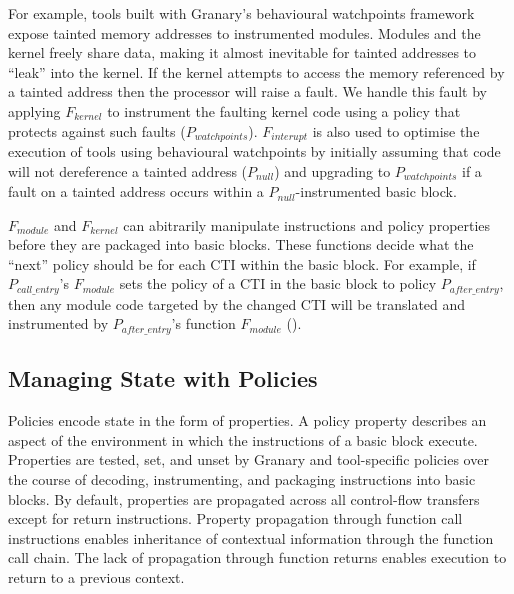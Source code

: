 \documentclass[letterpaper,twocolumn,10pt]{article}
\begin{document}
For example, tools built with Granary's behavioural watchpoints framework expose tainted memory addresses to instrumented modules. Modules and the kernel freely share data, making it almost inevitable for  tainted addresses to ``leak'' into the kernel. If the kernel attempts to access the memory referenced by a tainted address then the processor will raise a fault. We handle this fault by applying $F_{kernel}$ to instrument the faulting kernel code using a policy that protects against such faults ($P_{watchpoints}$). $F_{interupt}$ is also used to optimise the execution of tools using behavioural watchpoints by initially assuming that code will not dereference a tainted address ($P_{null}$) and upgrading to $P_{watchpoints}$ if a fault on a tainted address occurs within a $P_{null}$-instrumented basic block.



$F_{module}$ and $F_{kernel}$ can abitrarily manipulate instructions and policy properties before they are packaged into basic blocks. These functions decide what the ``next'' policy should be for each CTI within the basic block. For example, if $P_{call\_entry}$'s $F_{module}$ sets the policy of a CTI in the basic block to policy $P_{after\_entry}$, then any module code targeted by the changed CTI will be translated and instrumented by $P_{after\_entry}$'s function $F_{module}$ (). 


\subsection{Managing State with Policies}

Policies encode state in the form of properties. A policy property describes an aspect of the environment in which the instructions of a basic block execute. Properties are tested, set, and unset by Granary and tool-specific policies over the course of decoding, instrumenting, and packaging instructions into basic blocks. By default, properties are propagated across all control-flow transfers except for return instructions. Property propagation through function call instructions enables inheritance of contextual information through the function call chain. The lack of propagation through function returns enables execution to return to a previous context.
\end{document}
